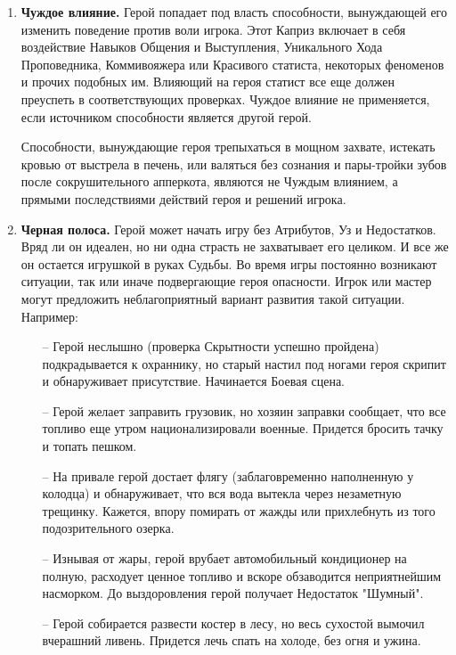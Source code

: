 \begin{enumerate}
    \item \textbf{Чуждое влияние.}
    \newline Герой попадает под власть способности, вынуждающей его изменить поведение против воли игрока. Этот Каприз включает в себя воздействие Навыков Общения и Выступления, Уникального Хода Проповедника, Коммивояжера или Красивого статиста, некоторых феноменов и прочих подобных им. Влияющий на героя статист все еще должен преуспеть в соответствующих проверках.
    \newline Чуждое влияние не применяется, если источником способности является другой герой.
    \begin{tcolorbox}
        Способности, вынуждающие героя трепыхаться в мощном захвате, истекать кровью от выстрела в печень, или валяться без сознания и пары-тройки зубов после сокрушительного апперкота, являются не Чуждым влиянием, а прямыми последствиями действий героя и решений игрока.
    \end{tcolorbox}

    \item \textbf{Черная полоса.}
    \newline Герой может начать игру без Атрибутов, Уз и Недостатков. Вряд ли он идеален, но ни одна страсть не захватывает его целиком. И все же он остается игрушкой в руках Судьбы. 
    \newline Во время игры постоянно возникают ситуации, так или иначе подвергающие героя опасности. Игрок или мастер могут предложить неблагоприятный вариант развития такой ситуации. Например:
    \begin{itemize}
        \item[--] Герой неслышно (проверка Скрытности успешно пройдена) подкрадывается к охраннику, но старый настил под ногами героя скрипит и обнаруживает присутствие. Начинается Боевая сцена.
        \item[--] Герой желает заправить грузовик, но хозяин заправки сообщает, что все топливо еще утром национализировали военные. Придется бросить тачку и топать пешком.
        \item[--] На привале герой достает флягу (заблаговременно наполненную у колодца) и обнаруживает, что вся вода вытекла через незаметную трещинку. Кажется, впору помирать от жажды или прихлебнуть из того подозрительного озерка.
        \item[--] Изнывая от жары, герой врубает автомобильный кондиционер на полную, расходует ценное топливо и вскоре обзаводится неприятнейшим насморком. До выздоровления герой получает Недостаток "Шумный".
        \item[--] Герой собирается развести костер в лесу, но весь сухостой вымочил вчерашний ливень. Придется лечь спать на холоде, без огня и ужина.
    \end{itemize}
\end{enumerate}
